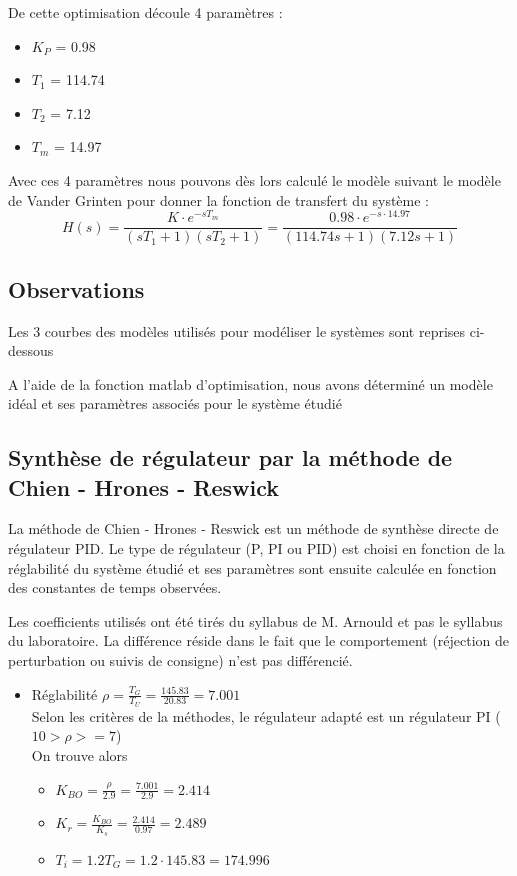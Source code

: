 De cette optimisation découle 4 paramètres :
\begin{itemize}
\item $K_{P}$ = 0.98
\item $T_{1}$ = 114.74
\item $T_{2}$ = 7.12
\item $T_{m}$ = 14.97
\end{itemize}

Avec ces 4 paramètres nous pouvons dès lors calculé le modèle suivant le modèle de Vander Grinten pour donner la fonction de transfert du système :
\begin{equation}
H(s) = \frac{K \cdot e^{-sT_{m}}}{(sT_{1} + 1)(sT_{2} + 1)} = 
\frac{0.98 \cdot e^{-s \cdot 14.97}}{(114.74s + 1)(7.12s + 1)}
\end{equation}

\subsection{Observations}
Les 3 courbes des modèles utilisés pour modéliser le systèmes sont reprises ci-dessous


A l'aide de la fonction matlab d'optimisation, nous avons déterminé un modèle idéal et ses paramètres associés pour le système étudié


\subsection{Synthèse de régulateur par la méthode de Chien - Hrones - Reswick}
La méthode de Chien - Hrones - Reswick est un méthode de synthèse directe de régulateur PID. Le type de régulateur (P, PI ou PID) est choisi en fonction de la réglabilité du système étudié et ses paramètres sont ensuite calculée en fonction des constantes de temps observées. 

Les coefficients utilisés ont été tirés du syllabus de M. Arnould et pas le syllabus du laboratoire. La différence réside dans le fait que le comportement (réjection de perturbation ou suivis de consigne) n'est pas différencié.

\begin{itemize}
\item Réglabilité $\rho = \frac{T_{G}}{T_{U}} = \frac{145.83}{20.83} = 7.001$\\
Selon les critères de la méthodes, le régulateur adapté est un régulateur PI ($10 > \rho >= 7$)\\

On trouve alors 
\begin{itemize}
\item $K_{BO} = \frac{\rho}{2.9} = \frac{7.001}{2.9} = 2.414$
\item $K_{r} = \frac{K_{BO}}{K_{s}} = \frac{2.414}{0.97} = 2.489$
\item $T_{i} = 1.2T_{G} = 1.2 \cdot 145.83 = 174.996$
\end{itemize}
\end{itemize}

